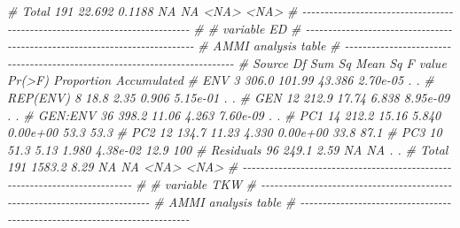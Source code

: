 \documentclass[
]{book}
\newenvironment{Shaded}{\begin{snugshade}}{\end{snugshade}}
\newcommand{\CommentTok}[1]{\textcolor[rgb]{0.56,0.35,0.01}{\textit{#1}}}
\numberwithin{equation}{section}
\begin{document}
\begin{Shaded}
\begin{Highlighting}[]
\CommentTok{\#      Total 191 22.692  0.1188      NA       NA       \textless{}NA\textgreater{}        \textless{}NA\textgreater{}}
\CommentTok{\# {-}{-}{-}{-}{-}{-}{-}{-}{-}{-}{-}{-}{-}{-}{-}{-}{-}{-}{-}{-}{-}{-}{-}{-}{-}{-}{-}{-}{-}{-}{-}{-}{-}{-}{-}{-}{-}{-}{-}{-}{-}{-}{-}{-}{-}{-}{-}{-}{-}{-}{-}{-}{-}{-}{-}{-}{-}{-}{-}{-}{-}{-}{-}{-}{-}{-}{-}{-}{-}{-}{-}{-}{-}{-}{-}}
\CommentTok{\# }
\CommentTok{\# variable ED }
\CommentTok{\# {-}{-}{-}{-}{-}{-}{-}{-}{-}{-}{-}{-}{-}{-}{-}{-}{-}{-}{-}{-}{-}{-}{-}{-}{-}{-}{-}{-}{-}{-}{-}{-}{-}{-}{-}{-}{-}{-}{-}{-}{-}{-}{-}{-}{-}{-}{-}{-}{-}{-}{-}{-}{-}{-}{-}{-}{-}{-}{-}{-}{-}{-}{-}{-}{-}{-}{-}{-}{-}{-}{-}{-}{-}{-}{-}}
\CommentTok{\# AMMI analysis table}
\CommentTok{\# {-}{-}{-}{-}{-}{-}{-}{-}{-}{-}{-}{-}{-}{-}{-}{-}{-}{-}{-}{-}{-}{-}{-}{-}{-}{-}{-}{-}{-}{-}{-}{-}{-}{-}{-}{-}{-}{-}{-}{-}{-}{-}{-}{-}{-}{-}{-}{-}{-}{-}{-}{-}{-}{-}{-}{-}{-}{-}{-}{-}{-}{-}{-}{-}{-}{-}{-}{-}{-}{-}{-}{-}{-}{-}{-}}
\CommentTok{\#     Source  Df Sum Sq Mean Sq F value   Pr(\textgreater{}F) Proportion Accumulated}
\CommentTok{\#        ENV   3  306.0  101.99  43.386 2.70e{-}05          .           .}
\CommentTok{\#   REP(ENV)   8   18.8    2.35   0.906 5.15e{-}01          .           .}
\CommentTok{\#        GEN  12  212.9   17.74   6.838 8.95e{-}09          .           .}
\CommentTok{\#    GEN:ENV  36  398.2   11.06   4.263 7.60e{-}09          .           .}
\CommentTok{\#        PC1  14  212.2   15.16   5.840 0.00e+00       53.3        53.3}
\CommentTok{\#        PC2  12  134.7   11.23   4.330 0.00e+00       33.8        87.1}
\CommentTok{\#        PC3  10   51.3    5.13   1.980 4.38e{-}02       12.9         100}
\CommentTok{\#  Residuals  96  249.1    2.59      NA       NA          .           .}
\CommentTok{\#      Total 191 1583.2    8.29      NA       NA       \textless{}NA\textgreater{}        \textless{}NA\textgreater{}}
\CommentTok{\# {-}{-}{-}{-}{-}{-}{-}{-}{-}{-}{-}{-}{-}{-}{-}{-}{-}{-}{-}{-}{-}{-}{-}{-}{-}{-}{-}{-}{-}{-}{-}{-}{-}{-}{-}{-}{-}{-}{-}{-}{-}{-}{-}{-}{-}{-}{-}{-}{-}{-}{-}{-}{-}{-}{-}{-}{-}{-}{-}{-}{-}{-}{-}{-}{-}{-}{-}{-}{-}{-}{-}{-}{-}{-}{-}}
\CommentTok{\# }
\CommentTok{\# variable TKW }
\CommentTok{\# {-}{-}{-}{-}{-}{-}{-}{-}{-}{-}{-}{-}{-}{-}{-}{-}{-}{-}{-}{-}{-}{-}{-}{-}{-}{-}{-}{-}{-}{-}{-}{-}{-}{-}{-}{-}{-}{-}{-}{-}{-}{-}{-}{-}{-}{-}{-}{-}{-}{-}{-}{-}{-}{-}{-}{-}{-}{-}{-}{-}{-}{-}{-}{-}{-}{-}{-}{-}{-}{-}{-}{-}{-}{-}{-}}
\CommentTok{\# AMMI analysis table}
\CommentTok{\# {-}{-}{-}{-}{-}{-}{-}{-}{-}{-}{-}{-}{-}{-}{-}{-}{-}{-}{-}{-}{-}{-}{-}{-}{-}{-}{-}{-}{-}{-}{-}{-}{-}{-}{-}{-}{-}{-}{-}{-}{-}{-}{-}{-}{-}{-}{-}{-}{-}{-}{-}{-}{-}{-}{-}{-}{-}{-}{-}{-}{-}{-}{-}{-}{-}{-}{-}{-}{-}{-}{-}{-}{-}{-}{-}}

\end{Highlighting}
\end{Shaded}
\end{document}
